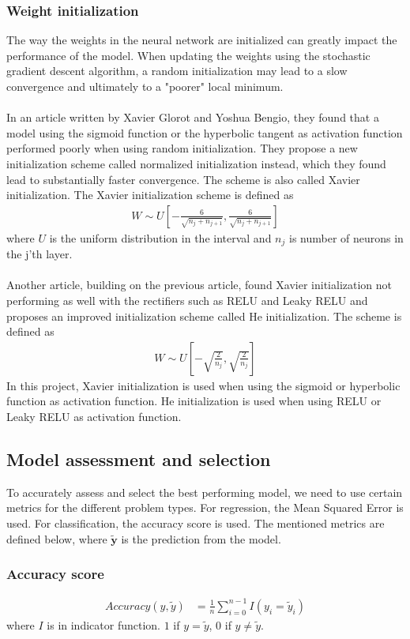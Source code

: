 \documentclass[a4paper,twocolumn]{article}
\newcommand{\ytilde}{\mathbf{\widetilde{y}}}
\begin{document}
\subsubsection{Weight initialization}
The way the weights in the neural network are initialized can greatly impact the performance of the model. When updating the weights using the stochastic gradient descent algorithm, a random initialization may lead to a slow convergence and ultimately to a "poorer" local minimum. \\
\\
In an article\cite{xavier} written by Xavier Glorot and Yoshua Bengio, they found that a model using the sigmoid function or the hyperbolic tangent as activation function performed poorly when using random initialization. They propose a new initialization scheme called normalized initialization instead, which they found lead to substantially faster convergence. The scheme is also called Xavier initialization. The Xavier initialization scheme is defined as
\begin{align}
    W \sim U\left[-\frac{6}{\sqrt{n_{j} + n_{j+1}}}, \frac{6}{\sqrt{n_{j} + n_{j+1}}}\right]
\end{align}
where $U$ is the uniform distribution in the interval and $n_{j}$ is number of neurons in the j'th layer.\\
\\
Another article\cite{he}, building on the previous article, found Xavier initialization not performing as well with the rectifiers such as RELU and Leaky RELU and proposes an improved initialization scheme called He initialization. The scheme is defined as
\begin{align}
    W \sim U\left[-\sqrt{\frac{2}{n_{j}}}, \sqrt{\frac{2}{n_{j}}}\right]
\end{align}
In this project, Xavier initialization is used when using the sigmoid or hyperbolic function as activation function. He initialization is used when using RELU or Leaky RELU as activation function.
\subsection{Model assessment and selection}
To accurately assess and select the best performing model, we need to use certain metrics for the different problem types. For regression, the Mean Squared Error is used. For classification, the accuracy score is used. The mentioned metrics are defined below, where $\ytilde$ is the prediction from the model.
\subsubsection{Accuracy score}
\begin{align}
        Accuracy(y, \widetilde{y}) &= \frac{1}{n} \sum_{i=0}^{n-1} I(y_{i} = \widetilde{y}_{i})
\end{align}
where $I$ is in indicator function. $1$ if $y = \widetilde{y}$, 0 if $y \neq \widetilde{y}$.
\end{document}
